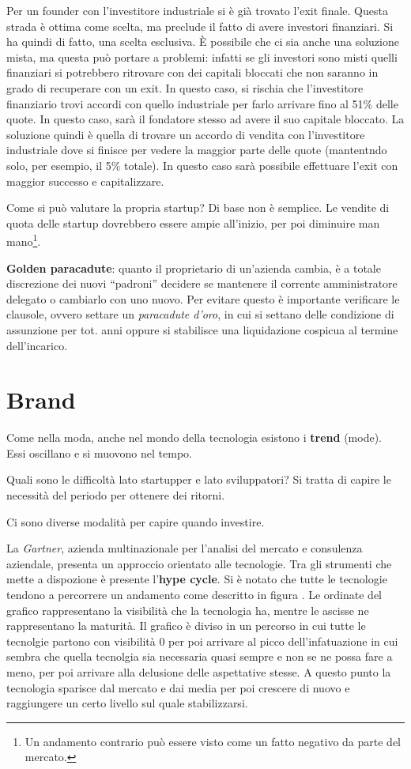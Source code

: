 Per un founder con l'investitore industriale si è già trovato l'exit finale.
Questa strada è ottima come scelta, ma preclude il fatto di avere investori
finanziari. Si ha quindi di fatto, una scelta esclusiva.
È possibile che ci sia anche una soluzione mista, ma questa può portare a
problemi: infatti se gli investori sono misti quelli finanziari si potrebbero
ritrovare con dei capitali bloccati che non saranno in grado di recuperare con
un exit. In questo caso, si rischia che l'investitore finanziario trovi accordi
con quello industriale per farlo arrivare fino al 51\% delle quote. In questo
caso, sarà il fondatore stesso ad avere il suo capitale bloccato. La soluzione
quindi è quella di trovare un accordo di vendita con l'investitore industriale
dove si finisce per vedere la maggior parte delle quote (mantentndo solo, per
esempio, il 5\% totale). In questo caso sarà possibile effettuare l'exit con
maggior successo e capitalizzare.

Come si può valutare la propria startup? Di base non è semplice. Le vendite di
quota delle startup dovrebbero essere ampie all'inizio, per poi diminuire man
mano\footnote{Un andamento contrario può essere visto come un fatto negativo da
parte del mercato.}.

\textbf{Golden paracadute}: quanto il proprietario di un'azienda cambia, è a
totale discrezione dei nuovi ``padroni'' decidere se mantenere il corrente
amministratore delegato o cambiarlo con uno nuovo. Per evitare questo è
importante verificare le clausole, ovvero settare un \textit{paracadute d'oro},
in cui si settano delle condizione di assunzione per tot. anni oppure si
stabilisce una liquidazione cospicua al termine dell'incarico.

\chapter{Brand}

Come nella moda, anche nel mondo della tecnologia esistono i \textbf{trend}
(mode). Essi oscillano e si muovono nel tempo.

Quali sono le difficoltà lato startupper e lato sviluppatori? Si tratta di
capire le necessità del periodo per ottenere dei ritorni.

Ci sono diverse modalità per capire quando investire.

La \textit{Gartner}, azienda multinazionale per l'analisi del mercato e
consulenza aziendale, presenta un approccio orientato alle tecnologie. Tra gli
strumenti che mette a dispozione è presente l'\textbf{hype cycle}.
Si è notato che tutte le tecnologie tendono a percorrere un andamento come
descritto in figura .
Le ordinate del grafico rappresentano la visibilità che la tecnologia ha,
mentre le ascisse ne rappresentano la maturità.
Il grafico è diviso in un percorso in cui tutte le tecnolgie partono con
visibilità 0 per poi arrivare al picco dell'infatuazione in cui sembra che
quella tecnolgia sia necessaria quasi sempre e non se ne possa fare a meno,
per poi arrivare alla delusione delle aspettative stesse.
A questo punto la tecnologia sparisce dal mercato e dai media per poi crescere
di nuovo e raggiungere un certo livello sul quale stabilizzarsi.

